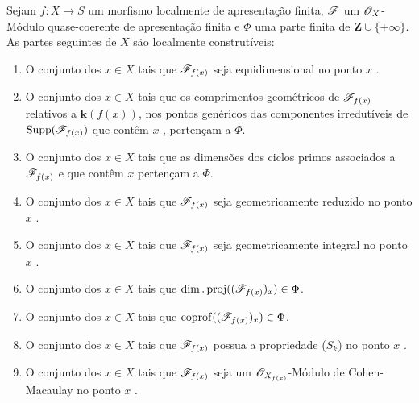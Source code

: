 \begin{proposition}[9.9.2]
\label{IV.9.9.2}
Sejam $f:X\to S$ um morfismo localmente de apresentação finita, $\mathscr{F}$ um $\mathscr{O}_X$-Módulo quase-coerente de apresentação finita e $\Phi$ uma parte finita de $\mathbf{Z}\cup\{\pm\infty\}$.
As partes seguintes de $X$ são localmente construtíveis:
\begin{enumerate}[label=(\roman*)]
  \item O conjunto dos $x\in X$ tais que $\mathscr{F}_{f(x)}$ seja equidimensional no ponto $x$ .
  \item O conjunto dos $x\in X$ tais que os comprimentos geométricos de $\mathscr{F}_{f(x)}$ relativos a $\mathbf{k}(f(x))$, nos pontos genéricos das componentes irredutíveis de $\operatorname{Supp}(\mathscr{F}_{f(x)})$ que contêm $x$ , pertençam a $\Phi$.
  \item O conjunto dos $x\in X$ tais que as dimensões dos ciclos primos associados a $\mathscr{F}_{f(x)}$ e que contêm $x$ pertençam a $\Phi$.
  \item O conjunto dos $x\in X$ tais que $\mathscr{F}_{f(x)}$ seja geometricamente reduzido no ponto $x$ .
  \item O conjunto dos $x\in X$ tais que $\mathscr{F}_{f(x)}$ seja geometricamente integral no ponto $x$ .
  \item O conjunto dos $x\in X$ tais que $\dim.\operatorname{proj}((\mathscr{F}_{f(x)})_x)\in\Phi$.
  \item O conjunto dos $x\in X$ tais que $\operatorname{coprof}((\mathscr{F}_{f(x)})_x)\in\Phi$.
  \item O conjunto dos $x\in X$ tais que $\mathscr{F}_{f(x)}$ possua a propriedade ($S_k$) no ponto $x$ .
  \item O conjunto dos $x\in X$ tais que $\mathscr{F}_{f(x)}$ seja um $\mathscr{O}_{X_{f(x)}}$-Módulo de Cohen-Macaulay no ponto $x$ .
\end{enumerate}
\end{proposition}

